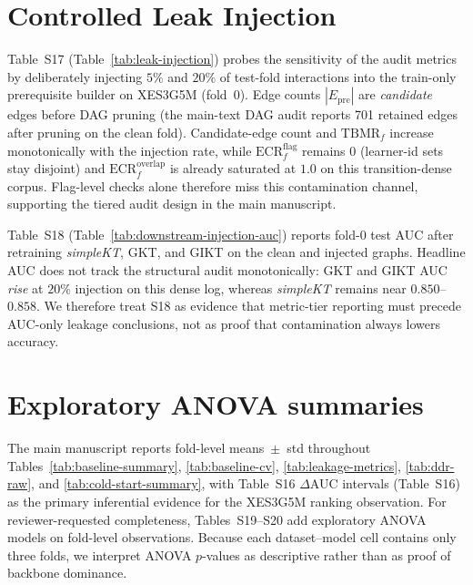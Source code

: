 \documentclass[pdflatex,sn-basic]{sn-jnl}
\newcommand{\Epre}{\ensuremath{E_{\text{pre}}}}
\begin{document}
\section{Controlled Leak Injection}
\label{sec:supp-leak-injection}
Table~S17 (Table~\ref{tab:leak-injection}) probes the sensitivity of the
audit metrics by deliberately injecting $5\%$ and $20\%$ of test-fold
interactions into the train-only prerequisite builder on XES3G5M (fold~0).
Edge counts $|\Epre|$ are \emph{candidate} edges before DAG pruning (the
main-text DAG audit reports 701 retained edges after pruning on the clean
fold). Candidate-edge count and $\mathrm{TBMR}_f$ increase monotonically with the
injection rate, while $\mathrm{ECR}^{\mathrm{flag}}_f$ remains $0$ (learner-id
sets stay disjoint) and $\mathrm{ECR}^{\mathrm{overlap}}_f$ is already
saturated at $1.0$ on this transition-dense corpus. Flag-level checks alone
therefore miss this contamination channel, supporting the tiered audit design
in the main manuscript.
\begin{table}[h!]
\centering
\caption{Controlled Leak Injection, XES3G5M fold~0. $|\Epre|$ counts candidate edges before DAG pruning. (Table S17)}
\label{tab:leak-injection}

\end{table}

Table~S18 (Table~\ref{tab:downstream-injection-auc}) reports fold-0 test AUC
after retraining \textit{simpleKT}, GKT, and GIKT on the clean and injected
graphs. Headline AUC does not track the structural audit monotonically: GKT
and GIKT AUC \emph{rise} at $20\%$ injection on this dense log, whereas
\textit{simpleKT} remains near $0.850$--$0.858$. We therefore treat S18 as
evidence that metric-tier reporting must precede AUC-only leakage
conclusions, not as proof that contamination always lowers accuracy.
\begin{table}[h!]
\centering
\caption{Downstream test AUC under controlled leak injection, XES3G5M fold~0 (Table S18)}
\label{tab:downstream-injection-auc}

\end{table}

\section{Exploratory ANOVA summaries}
\label{sec:supp-anova}
The main manuscript reports fold-level means~$\pm$~std throughout
Tables~\ref{tab:baseline-summary}, \ref{tab:baseline-cv},
\ref{tab:leakage-metrics}, \ref{tab:ddr-raw}, and
\ref{tab:cold-start-summary}, with Table~S16 $\Delta$AUC intervals
(Table~S16) as the primary inferential evidence for the XES3G5M ranking
observation. For reviewer-requested completeness, Tables~S19--S20 add
exploratory ANOVA models on fold-level observations. Because each
dataset--model cell contains only three folds, we interpret ANOVA
$p$-values as descriptive rather than as proof of backbone dominance.




\end{document}
